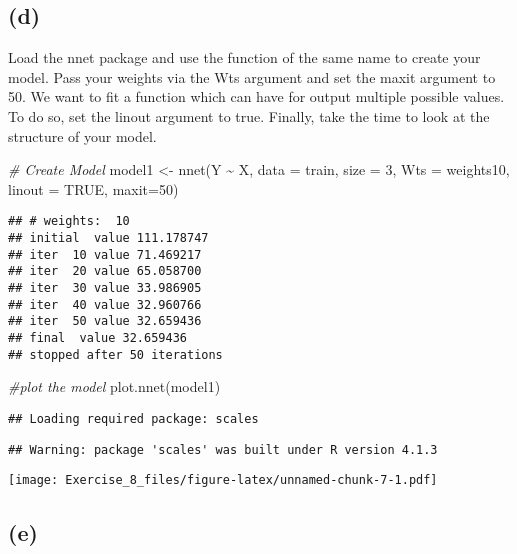 \documentclass[
]{article}
\newenvironment{Shaded}{\begin{snugshade}}{\end{snugshade}}
\newcommand{\AttributeTok}[1]{\textcolor[rgb]{0.77,0.63,0.00}{#1}}
\newcommand{\CommentTok}[1]{\textcolor[rgb]{0.56,0.35,0.01}{\textit{#1}}}
\newcommand{\ConstantTok}[1]{\textcolor[rgb]{0.00,0.00,0.00}{#1}}
\newcommand{\DecValTok}[1]{\textcolor[rgb]{0.00,0.00,0.81}{#1}}
\newcommand{\FunctionTok}[1]{\textcolor[rgb]{0.00,0.00,0.00}{#1}}
\newcommand{\NormalTok}[1]{#1}
\newcommand{\OtherTok}[1]{\textcolor[rgb]{0.56,0.35,0.01}{#1}}
\newcommand{\SpecialCharTok}[1]{\textcolor[rgb]{0.00,0.00,0.00}{#1}}
\begin{document}
\hypertarget{d}{%
\subsection{(d)}\label{d}}

Load the nnet package and use the function of the same name to create
your model. Pass your weights via the Wts argument and set the maxit
argument to 50. We want to fit a function which can have for output
multiple possible values. To do so, set the linout argument to true.
Finally, take the time to look at the structure of your model.

\begin{Shaded}
\begin{Highlighting}[]
\CommentTok{\# Create Model}
\NormalTok{model1 }\OtherTok{\textless{}{-}} \FunctionTok{nnet}\NormalTok{(Y }\SpecialCharTok{\textasciitilde{}}\NormalTok{ X, }\AttributeTok{data =}\NormalTok{ train, }\AttributeTok{size =} \DecValTok{3}\NormalTok{, }\AttributeTok{Wts =}\NormalTok{ weights10, }\AttributeTok{linout =} \ConstantTok{TRUE}\NormalTok{, }\AttributeTok{maxit=}\DecValTok{50}\NormalTok{)}
\end{Highlighting}
\end{Shaded}

\begin{verbatim}
## # weights:  10
## initial  value 111.178747 
## iter  10 value 71.469217
## iter  20 value 65.058700
## iter  30 value 33.986905
## iter  40 value 32.960766
## iter  50 value 32.659436
## final  value 32.659436 
## stopped after 50 iterations
\end{verbatim}

\begin{Shaded}
\begin{Highlighting}[]
\CommentTok{\#plot the model}
\FunctionTok{plot.nnet}\NormalTok{(model1)}
\end{Highlighting}
\end{Shaded}

\begin{verbatim}
## Loading required package: scales
\end{verbatim}

\begin{verbatim}
## Warning: package 'scales' was built under R version 4.1.3
\end{verbatim}

\texttt{[image: Exercise\_8\_files/figure-latex/unnamed-chunk-7-1.pdf]}

\hypertarget{e}{%
\subsection{(e)}\label{e}}
\end{document}
